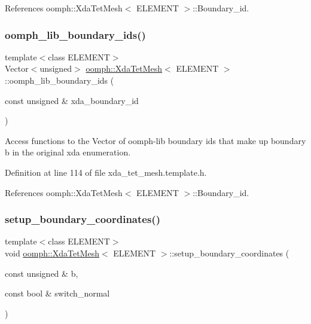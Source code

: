 References oomph\+::\+Xda\+Tet\+Mesh$<$ E\+L\+E\+M\+E\+N\+T $>$\+::\+Boundary\+\_\+id.

\mbox{\label{classoomph_1_1XdaTetMesh_ab690c0224586bfc7b46ff173da855ddd}} 
\subsubsection{\texorpdfstring{oomph\+\_\+lib\+\_\+boundary\+\_\+ids()}{oomph\_lib\_boundary\_ids()}}
{\footnotesize\ttfamily template$<$class E\+L\+E\+M\+E\+NT$>$ \\
Vector$<$unsigned$>$ \hyperlink{classoomph_1_1XdaTetMesh}{oomph\+::\+Xda\+Tet\+Mesh}$<$ E\+L\+E\+M\+E\+NT $>$\+::oomph\+\_\+lib\+\_\+boundary\+\_\+ids (\begin{DoxyParamCaption}\item[{const unsigned \&}]{xda\+\_\+boundary\+\_\+id }\end{DoxyParamCaption})\hspace{0.3cm}{\ttfamily [inline]}}



Access functions to the Vector of oomph-\/lib boundary ids that make up boundary b in the original xda enumeration. 



Definition at line 114 of file xda\+\_\+tet\+\_\+mesh.\+template.\+h.



References oomph\+::\+Xda\+Tet\+Mesh$<$ E\+L\+E\+M\+E\+N\+T $>$\+::\+Boundary\+\_\+id.

\mbox{\label{classoomph_1_1XdaTetMesh_a3a09ba1d3e29133dd032519ced703815}} 
\subsubsection{\texorpdfstring{setup\+\_\+boundary\+\_\+coordinates()}{setup\_boundary\_coordinates()}\hspace{0.1cm}{\footnotesize\ttfamily [1/2]}}
{\footnotesize\ttfamily template$<$class E\+L\+E\+M\+E\+NT$>$ \\
void \hyperlink{classoomph_1_1XdaTetMesh}{oomph\+::\+Xda\+Tet\+Mesh}$<$ E\+L\+E\+M\+E\+NT $>$\+::setup\+\_\+boundary\+\_\+coordinates (\begin{DoxyParamCaption}\item[{const unsigned \&}]{b,  }\item[{const bool \&}]{switch\+\_\+normal }\end{DoxyParamCaption})\hspace{0.3cm}{\ttfamily [inline]}}



